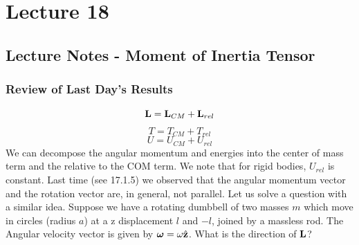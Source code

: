 \section{Lecture 18}
\subsection{Lecture Notes - Moment of Inertia Tensor}
\subsubsection{Review of Last Day's Results}
\[\mathbf{L} = \mathbf{L}_{CM} + \mathbf{L}_{rel}\]
\[T = T_{CM} + T_{rel}\]
\[U = U_{CM} + U_{rel}\]
We can decompose the angular momentum and energies into the center of mass term and the relative to the COM term. We note that for rigid bodies, $U_{rel}$ is constant. 
\newline Last time (see 17.1.5) we observed that the angular momentum vector and the rotation vector are, in general, not parallel. Let us solve a question with a similar idea. Suppose we have a rotating dumbbell of two masses $m$ which move in circles (radius $a$) at a z displacement $l$ and $-l$, joined by a massless rod. The Angular velocity vector is given by $\bm{\omega} = \omega\hat{\mathbf{z}}$. What is the direction of $\mathbf{L}$?
